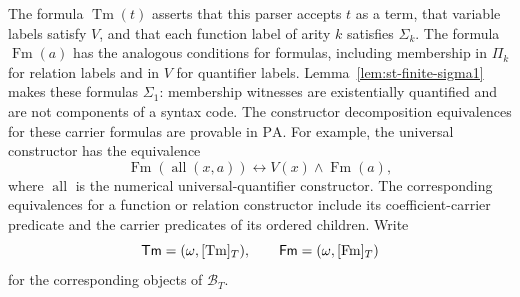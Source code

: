The formula $\operatorname{Tm}(t)$ asserts that this parser accepts
$t$ as a term, that variable labels satisfy $V$, and that each
function label of arity $k$ satisfies $\Sigma_k$. The formula
$\operatorname{Fm}(a)$ has the analogous conditions for formulas,
including membership in $\Pi_k$ for relation labels and in $V$ for
quantifier labels. Lemma~\ref{lem:st-finite-sigma1} makes these
formulas $\Sigma_1$: membership witnesses are existentially
quantified and are not components of a syntax code.
The constructor decomposition equivalences for these carrier
formulas are provable in $\mathrm{PA}$. For example, the universal
constructor has the equivalence
\[
 \operatorname{Fm}(\operatorname{all}(x,a))
       \longleftrightarrow V(x)\land\operatorname{Fm}(a),
\]
where $\operatorname{all}$ is the numerical universal-quantifier
constructor. The corresponding equivalences for a function or relation
constructor include its coefficient-carrier predicate and the
carrier predicates of its ordered children.
Write
\[
 \mathsf{Tm}=(\omega,[\operatorname{Tm}]_T),\qquad
 \mathsf{Fm}=(\omega,[\operatorname{Fm}]_T)
\]
for the corresponding objects of $\mathcal B_T$.


